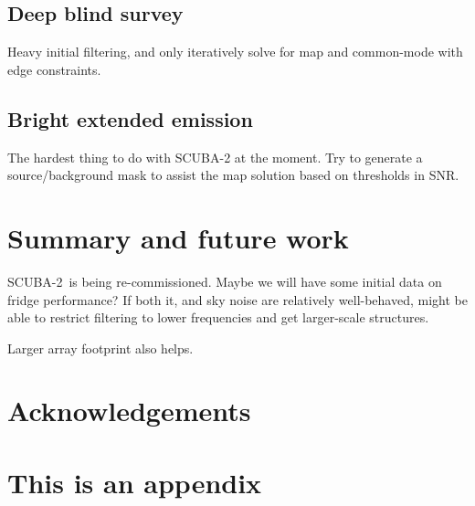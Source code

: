 \documentclass[useAMS,usenatbib,usegraphicx,nofootinbib]{mn2e}
\newcommand{\snr}{SNR}
\newcommand{\scuba}{SCUBA-2}
\begin{document}
\subsection{Deep blind survey}
Heavy initial filtering, and only iteratively solve for map and
common-mode with edge constraints.


\subsection{Bright extended emission}
The hardest thing to do with SCUBA-2 at the moment. Try to generate a
source/background mask to assist the map solution based on thresholds
in \snr.

\section{Summary and future work}
\label{sec:summary}

\scuba\ is being re-commissioned. Maybe we will have some initial data
on fridge performance? If both it, and sky noise are relatively
well-behaved, might be able to restrict filtering to lower frequencies
and get larger-scale structures.

Larger array footprint also helps.


\section{Acknowledgements}





\appendix
\section[]{This is an appendix}
\end{document}
